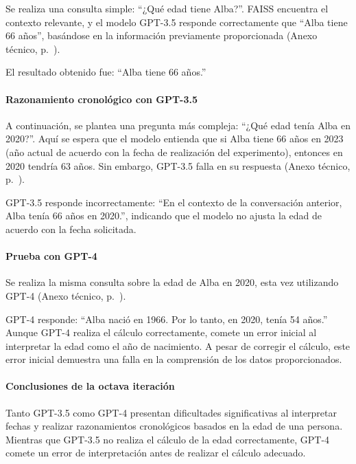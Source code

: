Se realiza una consulta simple: ``¿Qué edad tiene Alba?''. FAISS encuentra el contexto relevante, y el modelo GPT-3.5 responde correctamente que ``Alba tiene 66 años'', basándose en la información previamente proporcionada (Anexo técnico, p.~\pageref{anexo:code-4-1-8-4}).

El resultado obtenido fue: ``Alba tiene 66 años.''

\paragraph{Razonamiento cronológico con GPT-3.5}

A continuación, se plantea una pregunta más compleja: ``¿Qué edad tenía Alba en 2020?''. Aquí se espera que el modelo entienda que si Alba tiene 66 años en 2023 (año actual de acuerdo con la fecha de realización del experimento), entonces en 2020 tendría 63 años. Sin embargo, GPT-3.5 falla en su respuesta (Anexo técnico, p.~\pageref{anexo:code-4-1-8-5}).

GPT-3.5 responde incorrectamente: ``En el contexto de la conversación anterior, Alba tenía 66 años en 2020.'', indicando que el modelo no ajusta la edad de acuerdo con la fecha solicitada.

\paragraph{Prueba con GPT-4}

Se realiza la misma consulta sobre la edad de Alba en 2020, esta vez utilizando GPT-4 (Anexo técnico, p.~\pageref{anexo:code-4-1-8-6}).

GPT-4 responde: ``Alba nació en 1966. Por lo tanto, en 2020, tenía 54 años.'' Aunque GPT-4 realiza el cálculo correctamente, comete un error inicial al interpretar la edad como el año de nacimiento. A pesar de corregir el cálculo, este error inicial demuestra una falla en la comprensión de los datos proporcionados.

\paragraph{Conclusiones de la octava iteración}

Tanto GPT-3.5 como GPT-4 presentan dificultades significativas al interpretar fechas y realizar razonamientos cronológicos basados en la edad de una persona. Mientras que GPT-3.5 no realiza el cálculo de la edad correctamente, GPT-4 comete un error de interpretación antes de realizar el cálculo adecuado.

